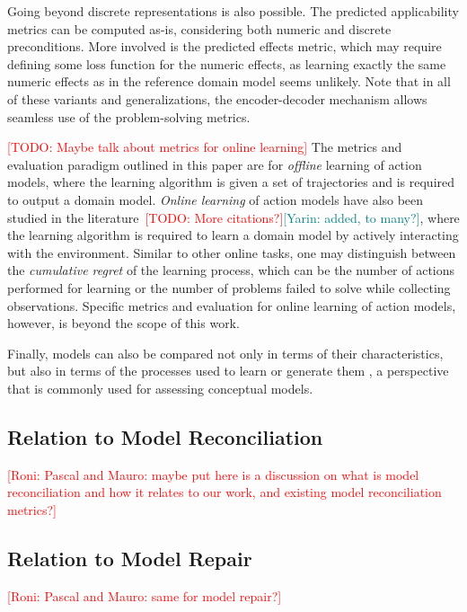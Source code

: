 \documentclass{article}
\theoremstyle{definition}
\theoremstyle{remark}
\newcommand{\todo}[1]{{\textcolor{red}{[TODO: #1]}}}
\newcommand{\roni}[1]{{\textcolor{red}{[Roni: #1]}}}
\newcommand{\yarin}[1]{{\textcolor{teal}{[Yarin: #1]}}}
\begin{document}
Going beyond discrete representations is also possible. 
The predicted applicability metrics can be computed as-is, considering both numeric and discrete preconditions.
More involved is the predicted effects metric, which may require defining some loss function for the numeric effects, as learning exactly the same numeric effects as in the reference domain model seems unlikely. 
Note that in all of these variants and generalizations, the encoder-decoder mechanism allows seamless use of the problem-solving metrics. 


\todo{Maybe talk about metrics for online learning}
The metrics and evaluation paradigm outlined in this paper are for \emph{offline} learning of action models, where the learning algorithm is given a set of trajectories and is required to output a domain model. \emph{Online learning} of action models have also been studied in the literature~\citep{lamanna2021online, sreedharan2023optimistic, benyamin2025integratingreinforcementlearningaction, ng2019incremental, chitnis2021glib, verma2023autonomous, karia2023epistemic, jin2022creativity}\todo{More citations?}\yarin{added, to many?}, where the learning algorithm is required to learn a domain model by actively interacting with the environment. Similar to other online tasks, one may distinguish between the \emph{cumulative regret} of the learning process, which can be the number of actions performed for learning or the number of problems failed to solve while collecting observations. 
Specific metrics and evaluation for online learning of action models, however, is beyond the scope of this work. 

Finally, models can also be compared not only in terms of their characteristics, but also in terms of the processes used to learn or generate them \citep{vallati2021quality}, a perspective that is commonly used for assessing conceptual models.



\subsection{Relation to Model Reconciliation}
\roni{Pascal and Mauro: maybe put here is a discussion on what is model reconciliation and how it relates to our work, 
and existing model reconciliation metrics?}

\subsection{Relation to Model Repair}
\roni{Pascal and Mauro: same for model repair?}
\end{document}
